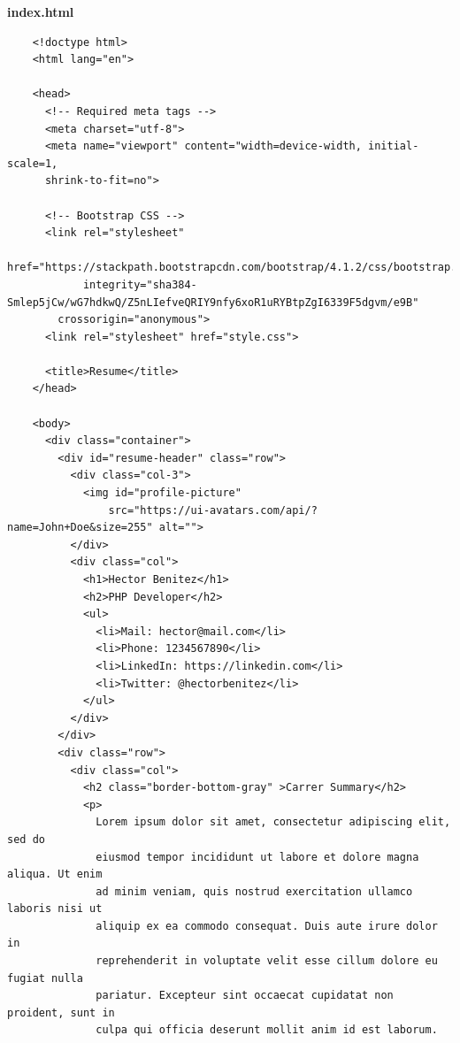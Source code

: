 \documentclass{article}
\begin{document}
\textbf{index.html}
\begin{verbatim}
    <!doctype html>
    <html lang="en">

    <head>
      <!-- Required meta tags -->
      <meta charset="utf-8">
      <meta name="viewport" content="width=device-width, initial-scale=1,
      shrink-to-fit=no">

      <!-- Bootstrap CSS -->
      <link rel="stylesheet"
            href="https://stackpath.bootstrapcdn.com/bootstrap/4.1.2/css/bootstrap.min.css"
            integrity="sha384-Smlep5jCw/wG7hdkwQ/Z5nLIefveQRIY9nfy6xoR1uRYBtpZgI6339F5dgvm/e9B"
        crossorigin="anonymous">
      <link rel="stylesheet" href="style.css">

      <title>Resume</title>
    </head>

    <body>
      <div class="container">
        <div id="resume-header" class="row">
          <div class="col-3">
            <img id="profile-picture"
                src="https://ui-avatars.com/api/?name=John+Doe&size=255" alt="">
          </div>
          <div class="col">
            <h1>Hector Benitez</h1>
            <h2>PHP Developer</h2>
            <ul>
              <li>Mail: hector@mail.com</li>
              <li>Phone: 1234567890</li>
              <li>LinkedIn: https://linkedin.com</li>
              <li>Twitter: @hectorbenitez</li>
            </ul>
          </div>
        </div>
        <div class="row">
          <div class="col">
            <h2 class="border-bottom-gray" >Carrer Summary</h2>
            <p>
              Lorem ipsum dolor sit amet, consectetur adipiscing elit, sed do
              eiusmod tempor incididunt ut labore et dolore magna aliqua. Ut enim
              ad minim veniam, quis nostrud exercitation ullamco laboris nisi ut
              aliquip ex ea commodo consequat. Duis aute irure dolor in
              reprehenderit in voluptate velit esse cillum dolore eu fugiat nulla
              pariatur. Excepteur sint occaecat cupidatat non proident, sunt in
              culpa qui officia deserunt mollit anim id est laborum.


\end{verbatim}
\end{document}
